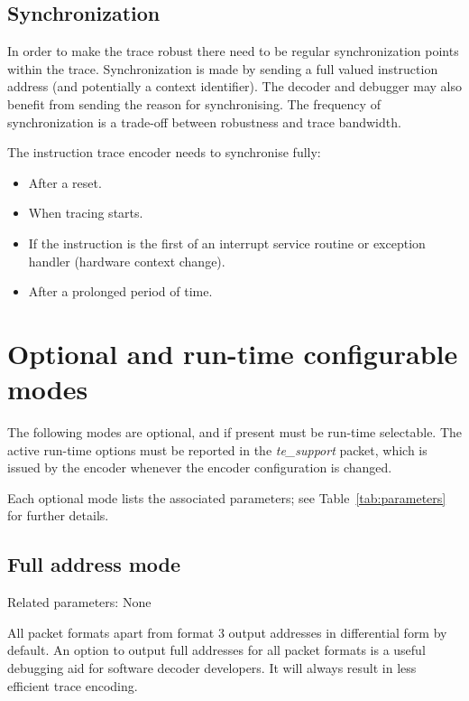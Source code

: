 \subsection{Synchronization} \label{synchronization}

In order to make the trace robust there need to be regular
synchronization points within the trace. Synchronization is made by
sending a full valued instruction address (and potentially a context
identifier). The decoder and debugger may also benefit from sending
the reason for synchronising. The frequency of synchronization is a
trade-off between robustness and trace bandwidth.

The instruction trace encoder needs to synchronise fully:

\begin{itemize}

\item After a reset.
  \item When tracing starts.
\item If the instruction is the first of an interrupt service routine or
exception handler (hardware context change).
\item After a prolonged period of time.
\end{itemize}

\section{Optional and run-time configurable modes} \label{optional}

The following modes are optional, and if present must be run-time selectable.  The 
active run-time options must be reported in the \textit{te\_support} packet, which is issued by the
encoder whenever the encoder configuration is changed.

Each optional mode lists the associated parameters; see Table~\ref{tab:parameters} for further 
details.

\subsection{Full address mode} \label{sec:full-address}

Related parameters: None

All packet formats apart from format 3 output addresses in differential form by default.
An option to output full addresses for all packet formats is a useful debugging aid for 
software decoder developers.  It will always result in less efficient trace encoding.

